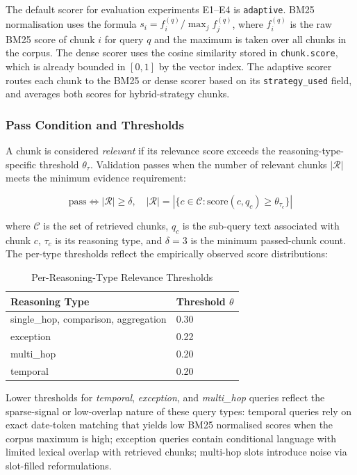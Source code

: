 The default scorer for evaluation experiments E1--E4 is \texttt{adaptive}.
BM25 normalisation uses the formula $s_i = f_i^{(q)} / \max_j f_j^{(q)}$,
where $f_i^{(q)}$ is the raw BM25 score of chunk $i$ for query $q$ and the
maximum is taken over all chunks in the corpus. The dense scorer uses the
cosine similarity stored in \texttt{chunk.score}, which is already bounded
in $[0, 1]$ by the vector index. The adaptive scorer routes each chunk to the
BM25 or dense scorer based on its \texttt{strategy\_used} field, and averages
both scores for hybrid-strategy chunks.

\subsubsection*{Pass Condition and Thresholds}

A chunk is considered \emph{relevant} if its relevance score exceeds the
reasoning-type-specific threshold $\theta_{\tau}$. Validation passes when
the number of relevant chunks $|\mathcal{R}|$ meets the minimum evidence
requirement:

\begin{equation}
\text{pass} \iff |\mathcal{R}| \geq \delta, \quad
|\mathcal{R}| = |\{c \in \mathcal{C} : \text{score}(c, q_c) \geq \theta_{\tau_c}\}|
\label{eq:v2_pass}
\end{equation}

where $\mathcal{C}$ is the set of retrieved chunks, $q_c$ is the sub-query
text associated with chunk $c$, $\tau_c$ is its reasoning type, and $\delta = 3$
is the minimum passed-chunk count. The per-type thresholds reflect the
empirically observed score distributions:

\begin{table}[H]
\centering
\caption{Per-Reasoning-Type Relevance Thresholds}
\label{tab:v2_thresholds}
\begin{tabular}{ll}
\toprule
\textbf{Reasoning Type} & \textbf{Threshold $\theta$} \\
\midrule
single\_hop, comparison, aggregation & 0.30 \\
exception                            & 0.22 \\
multi\_hop                           & 0.20 \\
temporal                             & 0.20 \\
\bottomrule
\end{tabular}
\end{table}

Lower thresholds for \textit{temporal}, \textit{exception}, and
\textit{multi\_hop} queries reflect the sparse-signal or low-overlap nature
of these query types: temporal queries rely on exact date-token matching that
yields low BM25 normalised scores when the corpus maximum is high; exception
queries contain conditional language with limited lexical overlap with
retrieved chunks; multi-hop slots introduce noise via slot-filled reformulations.

